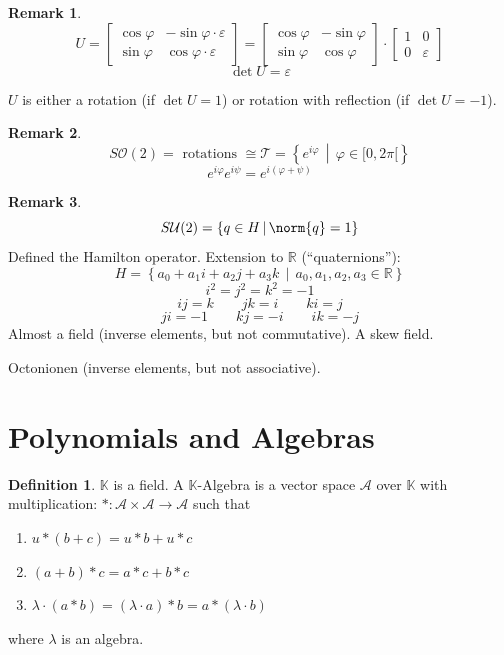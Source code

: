 \documentclass[a4paper,landscape,twocolumn]{article}
\newcommand\setdef[2]{\left\{#1\,\middle|\,#2\right\}}
\theoremstyle{definition}
\newtheorem{defi}{Definition}
\newtheorem{rem}{Remark}
\DeclarePairedDelimiter\norm\lVert\rVert
\begin{document}
\begin{rem}
  \[
    U = \begin{bmatrix}
      \cos\varphi & -\sin\varphi \cdot \varepsilon \\
      \sin\varphi & \cos\varphi \cdot \varepsilon
    \end{bmatrix}
    =
    \begin{bmatrix}
      \cos{\varphi} & -\sin{\varphi} \\
      \sin{\varphi} & \cos{\varphi}
    \end{bmatrix} \cdot \begin{bmatrix}
      1 & 0 \\
      0 & \varepsilon
    \end{bmatrix}
  \]
  \[ \det{U} = \varepsilon \]

  $U$ is either a rotation (if $\det{U} = 1$) or rotation with reflection (if $\det{U} = -1$).
\end{rem}

\begin{rem}
  \[ S\mathcal O(2) = \text{ rotations } \cong \mathcal T = \setdef{e^{i\varphi}}{\varphi \in [0,2\pi[} \]
  \[ e^{i\varphi} e^{i\psi} = e^{i(\varphi + \psi)} \]
\end{rem}

\begin{rem}
  \[ S\mathcal U(2) = \setdef{q \in H}{\norm{q} = 1} \]
  Defined the Hamilton operator. Extension to $\mathbb R$ (\enquote{quaternions}):
  \[ H = \setdef{a_0 + a_1 i + a_2 j + a_3 k}{a_0, a_1, a_2, a_3 \in \mathbb R} \]
  \[ i^2 = j^2 = k^2 = -1 \]
  \[ ij = k \qquad jk = i \qquad ki = j \]
  \[ ji = -1 \qquad kj = -i \qquad ik = -j \]
  Almost a field (inverse elements, but not commutative). A skew field.

  Octonionen (inverse elements, but not associative).
\end{rem}

\section{Polynomials and Algebras}
\begin{defi}
  $\mathbb K$ is a field.
  A $\mathbb K$-Algebra is a vector space $\mathcal A$ over $\mathbb K$
  with multiplication: $*: \mathcal A \times \mathcal A \to \mathcal A$
  such that
  \begin{enumerate}
    \item $u * (b + c) = u * b + u * c$
    \item $(a + b) * c = a * c + b * c$
    \item $\lambda \cdot (a * b) = (\lambda \cdot a) * b = a * (\lambda \cdot b)$
  \end{enumerate}
  where $\lambda$ is an algebra.
\end{defi}
\end{document}
